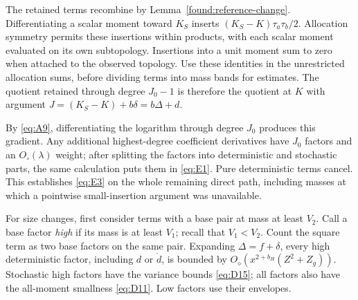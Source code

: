 The retained terms recombine by Lemma~\ref{found:reference-change}.
Differentiating a scalar moment toward \(K_S\) inserts
\((K_S-K)\tau_a\tau_b/2\). Allocation symmetry permits these
insertions within products, with each scalar moment evaluated on its
own subtopology. Insertions into a unit moment sum to zero when
attached to the observed topology. Use these identities in the
unrestricted allocation sums, before dividing terms into mass bands
for estimates. The quotient retained through degree \(J_0-1\) is
therefore the quotient at \(K\) with argument
\(J=(K_S-K)+b\delta=b\Delta+d\).

By \eqref{eq:A9}, differentiating the logarithm through degree \(J_0\)
produces this gradient. Any additional highest-degree coefficient
derivatives have \(J_0\) factors and an \(O_\circ(\lambda)\) weight;
after splitting the factors into deterministic and stochastic parts,
the same calculation puts them in \eqref{eq:E1}. Pure deterministic
terms cancel. This establishes \eqref{eq:E3} on the whole remaining
direct path, including masses at which a pointwise small-insertion
argument was unavailable.

For size changes, first consider terms with a base pair at mass at
least \(V_2\). Call a base factor \emph{high} if its mass is at least
\(V_1\); recall that \(V_1<V_2\). Count the square term as two base
factors on the same pair. Expanding \(\Delta=f+\delta\), every high
deterministic factor, including \(d\) or \(\dot d\), is bounded by
\(O_\diamond(x^{2+b_H}(Z^2+Z_g))\). Stochastic high factors have the
variance bounds \eqref{eq:D15}; all factors also have the all-moment
smallness \eqref{eq:D11}. Low factors use their envelopes.

